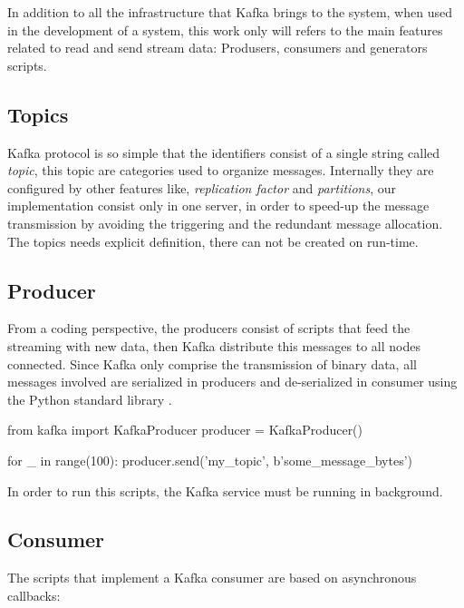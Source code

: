 In addition to all the infrastructure that Kafka brings to the system, when used in the development of a system, this work only will refers to the main features related to read and send stream data: Produsers, consumers and generators scripts.


\subsection{Topics}

Kafka protocol is so simple that the identifiers consist of a single string called \textit{topic}, this topic are categories used to organize messages. Internally they are configured by other features like, \textit{replication factor} and \textit{partitions}, our implementation consist only in one server, in order to speed-up the message transmission by avoiding the triggering and the redundant message allocation. The topics needs explicit definition, there can not be created on run-time.

\subsection{Producer}

From a coding perspective, the producers consist of scripts that feed the streaming with new data, then Kafka distribute this messages to all nodes connected. Since Kafka only comprise the transmission of binary data, all messages involved are serialized in producers and  de-serialized in consumer using the Python standard library .

\begin{python}
from kafka import KafkaProducer
producer = KafkaProducer()

for _ in range(100):
    producer.send('my_topic', b'some_message_bytes')
\end{python}

In order to run this scripts, the Kafka service must be running in background. 

\subsection{Consumer}

The scripts that implement a Kafka consumer are based on asynchronous callbacks:

